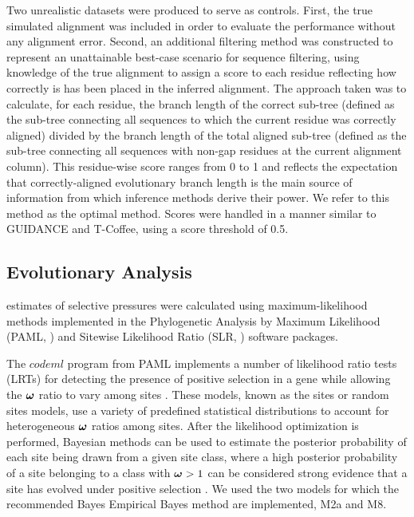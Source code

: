 \documentclass{article}
\begin{document}
Two unrealistic datasets were produced to serve as controls. First,
the true simulated alignment was included in order to evaluate the \sw
performance without any alignment error. Second, an additional
filtering method was constructed to represent an unattainable
best-case scenario for sequence filtering, using knowledge of the true
alignment to assign a score to each residue reflecting how correctly
is has been placed in the inferred alignment. The approach taken was
to calculate, for each residue, the branch length of the correct
sub-tree (defined as the sub-tree connecting all sequences to which
the current residue was correctly aligned) divided by the branch
length of the total aligned sub-tree (defined as the sub-tree
connecting all sequences with non-gap residues at the current
alignment column). This residue-wise score ranges from 0 to 1 and
reflects the expectation that correctly-aligned evolutionary branch
length is the main source of information from which \sw inference
methods derive their power. We refer to this method as the optimal
method. Scores were handled in a manner similar to GUIDANCE and
T-Coffee, using a score threshold of 0.5.

\subsection*{\Sw Evolutionary Analysis}

\Sw estimates of selective pressures were calculated using
maximum-likelihood methods implemented in the Phylogenetic Analysis by
Maximum Likelihood (PAML, \citealt{Yang2007PAML}) and Sitewise Likelihood Ratio
(SLR, \citealt{Massingham2005Detecting}) software packages.

The $codeml$ program from PAML implements a number of likelihood ratio
tests (LRTs) for detecting the presence of positive selection in a
gene while allowing the $\bm{\omega}$ ratio to vary among sites
\citep{Yang2000CodonSubstitution}. These models, known as the sites or
random sites models, use a variety of predefined statistical
distributions to account for heterogeneous $\bm{\omega}$ ratios among sites. After
the likelihood optimization is performed, Bayesian methods can be used
to estimate the posterior probability of each site being drawn from a
given site class, where a high posterior probability of a site
belonging to a class with $\bm{\omega}>1$ can be considered strong
evidence that a site has evolved under positive selection
\citep{Yang2005Bayes}. We used the two models for which the
recommended Bayes Empirical Bayes method are implemented, M2a and M8.
\end{document}
